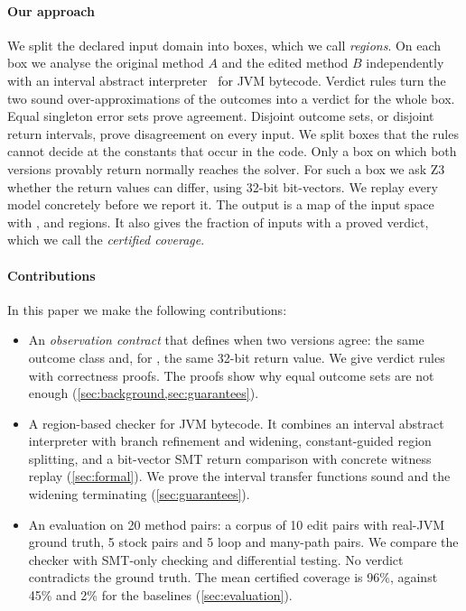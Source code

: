 \paragraph{Our approach}
We split the declared input domain into boxes, which we call \emph{regions}. On each box we
analyse the original method $A$ and the edited method $B$ independently with an interval
abstract interpreter~\citep{cousot1977abstract} for JVM bytecode. Verdict rules turn the two
sound over-approximations of the outcomes into a verdict for the whole box. Equal singleton
error sets prove agreement. Disjoint outcome sets, or disjoint return intervals, prove
disagreement on every input. We split boxes that the rules cannot decide at the constants that
occur in the code. Only a box on which both versions provably return normally reaches the
solver. For such a box we ask Z3~\citep{demoura2008z3} whether the return values can differ,
using 32-bit bit-vectors. We replay every model concretely before we report it. The output is
a map of the input space with \pres{}, \chg{} and \unk{} regions. It also gives the fraction
of inputs with a proved verdict, which we call the \emph{certified coverage}.

\paragraph{Contributions}
In this paper we make the following contributions:
\begin{itemize}
  \item An \emph{observation contract} that defines when two versions agree: the same outcome
        class and, for \ok{}, the same 32-bit return value. We give verdict rules with
        correctness proofs. The proofs show why equal outcome sets are not enough
        (\cref{sec:background,sec:guarantees}).
  \item A region-based checker for JVM bytecode. It combines an interval abstract
        interpreter with branch refinement and widening, constant-guided region splitting,
        and a bit-vector SMT return comparison with concrete witness replay
        (\cref{sec:formal}). We prove the interval transfer functions sound and the widening
        terminating (\cref{sec:guarantees}).
  \item An evaluation on 20 method pairs: a corpus of 10 edit pairs with real-JVM ground
        truth, 5 stock \jpamb{} pairs and 5 loop and many-path pairs. We compare the checker
        with SMT-only checking and differential testing. No verdict contradicts the ground
        truth. The mean certified coverage is 96\%, against 45\% and 2\% for the baselines
        (\cref{sec:evaluation}).
\end{itemize}
